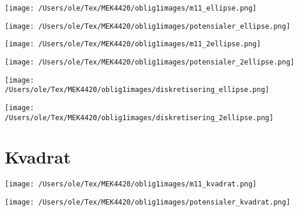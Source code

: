 \documentclass{article}
\begin{document}


{\noindent\texttt{[image: /Users/ole/Tex/MEK4420/oblig1images/m11\_ellipse.png]}
}

{\noindent\texttt{[image: /Users/ole/Tex/MEK4420/oblig1images/potensialer\_ellipse.png]}
}



{\noindent\texttt{[image: /Users/ole/Tex/MEK4420/oblig1images/m11\_2ellipse.png]}
}

{\noindent\texttt{[image: /Users/ole/Tex/MEK4420/oblig1images/potensialer\_2ellipse.png]}
}


{\noindent\texttt{[image: /Users/ole/Tex/MEK4420/oblig1images/diskretisering\_ellipse.png]}
}

{\noindent\texttt{[image: /Users/ole/Tex/MEK4420/oblig1images/diskretisering\_2ellipse.png]}
}


\section{Kvadrat}

{\noindent\texttt{[image: /Users/ole/Tex/MEK4420/oblig1images/m11\_kvadrat.png]}
}

{\noindent\texttt{[image: /Users/ole/Tex/MEK4420/oblig1images/potensialer\_kvadrat.png]}
}
\end{document}
